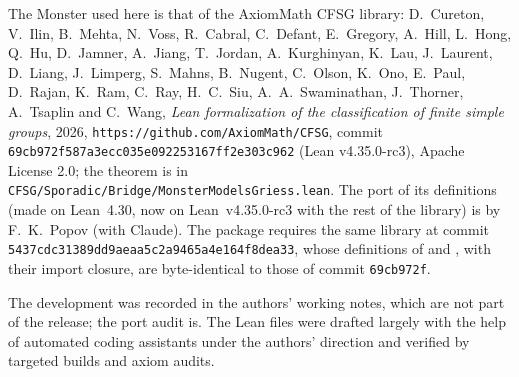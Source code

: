 The Monster used here is that of the AxiomMath CFSG library: D.~Cureton, V.~Ilin, B.~Mehta, N.~Voss, R.~Cabral, C.~Defant,
E.~Gregory, A.~Hill, L.~Hong, Q.~Hu, D.~Jamner, A.~Jiang, T.~Jordan, A.~Kurghinyan, K.~Lau, J.~Laurent, D.~Liang, J.~Limperg,
S.~Mahns, B.~Nugent, C.~Olson, K.~Ono, E.~Paul, D.~Rajan, K.~Ram, C.~Ray, H.~C.~Siu, A.~A.~Swaminathan, J.~Thorner, A.~Tsaplin and
C.~Wang, \emph{Lean formalization of the classification of finite simple groups}, 2026, \texttt{https://github.com/AxiomMath/CFSG},
commit \texttt{69cb972f587a3ecc035e092253167ff2e303c962} (Lean v4.35.0-rc3), Apache License 2.0; the theorem
 is in \texttt{CFSG/Sporadic/Bridge/MonsterModelsGriess.lean}.
The port of its definitions (made on Lean~4.30, now on Lean~v4.35.0-rc3 with the rest of the library) is by F.~K.~Popov (with
Claude).  The package  requires the same library at commit \texttt{5437cdc31389dd9aeaa5c2a9465a4e164f8dea33}, whose definitions of  and ,
with their import closure, are byte-identical to those of commit \texttt{69cb972f}.

The development was recorded in the authors' working notes, which are not part of the release; the port audit  is.  The Lean files were drafted largely with the help of automated coding assistants under the authors' direction and verified by targeted builds and axiom audits.

\endgroup
